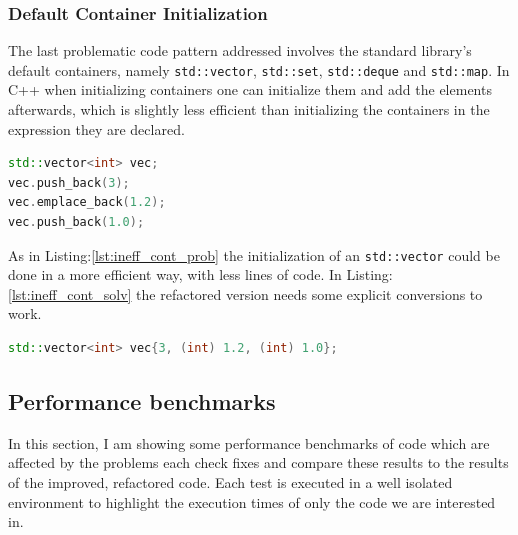 \subsubsection{Default Container Initialization}
\par The last problematic code pattern addressed involves the standard library's default containers, namely \verb|std::vector|, \verb|std::set|, \verb|std::deque| and \verb|std::map|. In C++ when initializing containers one can initialize them and add the elements afterwards, which is slightly less efficient than initializing the containers in the expression they are declared. \medskip
\begin{lstlisting}[language=c++, frame=single ,caption={Inefficient way of creating containers}, label={lst:ineff_cont_prob}]
std::vector<int> vec;
vec.push_back(3);
vec.emplace_back(1.2);
vec.push_back(1.0);
\end{lstlisting}
\par As in Listing:\ref{lst:ineff_cont_prob} the initialization of an \verb|std::vector| could be done in a more efficient way, with less lines of code. In Listing:\ref{lst:ineff_cont_solv}  the refactored version needs some explicit conversions to work. 
\begin{lstlisting}[language=c++, frame=single ,caption={A faster way of initializing}, label={lst:ineff_cont_solv}]
std::vector<int> vec{3, (int) 1.2, (int) 1.0};
\end{lstlisting}
\subsection{Performance benchmarks}
\par In this section, I am showing some performance benchmarks of code which are affected by the problems each check fixes and compare these results to the results of the improved, refactored code. Each test is executed in a well isolated environment to highlight the execution times of only the code we are interested in. 
